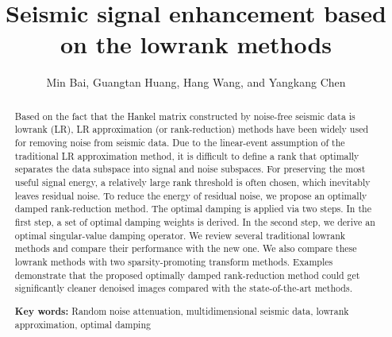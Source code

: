 
\title{Seismic signal enhancement based on the lowrank methods}
\author{Min Bai\footnotemark[1]\footnotemark[2], Guangtan Huang\footnotemark[1], Hang Wang\footnotemark[1], and Yangkang Chen\footnotemark[1]}

\renewcommand{\thefootnote}{\fnsymbol{footnote}}



\address{
\footnotemark[1]School of Earth Sciences\\
Zhejiang University\\
Hangzhou, Zhejiang Province, China, 310027\\
baimin2016@126.com \\
\footnotemark[2]
Key Laboratory of Exploration Technology for Oil and Gas Resources of Ministry of Education\\
Yangtze University\\
Wuhan, Hubei Province, China, 430100 \\
}


\DeclareRobustCommand{\dlo}[1]{}
\DeclareRobustCommand{\wen}[1]{#1}


\begin{abstract}
Based on the fact that the Hankel matrix constructed by noise-free seismic data is lowrank (LR), LR approximation (or rank-reduction) methods have been widely used for removing noise from seismic data. Due to the linear-event assumption of the traditional LR approximation method, it is difficult to define a rank that optimally separates the data subspace into signal and noise subspaces. For preserving the most useful signal energy, a relatively large rank threshold is often chosen, which inevitably leaves residual noise. To reduce the energy of residual noise, we propose an optimally damped rank-reduction method. The optimal damping is applied via two steps. In the first step, a set of optimal damping weights is derived. In the second step, we derive an optimal singular-value damping operator. We review several traditional lowrank methods and compare their performance with the new one. We also compare these lowrank methods with two sparsity-promoting transform methods. Examples demonstrate that the proposed optimally damped rank-reduction method could get significantly cleaner denoised images compared with the state-of-the-art methods.  \par
\textbf{Key words:} Random noise attenuation, multidimensional seismic data, lowrank approximation, optimal damping
\end{abstract}

